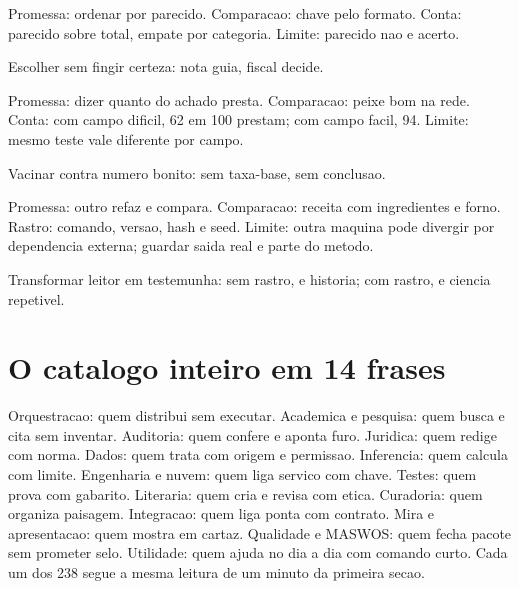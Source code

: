 
\begin{descricao}
Promessa: ordenar por parecido. Comparacao: chave pelo formato. Conta: parecido sobre total, empate por categoria. Limite: parecido nao e acerto.
\end{descricao}

\begin{funcao}
Escolher sem fingir certeza: nota guia, fiscal decide.
\end{funcao}


\begin{descricao}
Promessa: dizer quanto do achado presta. Comparacao: peixe bom na rede. Conta: com campo dificil, 62 em 100 prestam; com campo facil, 94. Limite: mesmo teste vale diferente por campo.
\end{descricao}

\begin{funcao}
Vacinar contra numero bonito: sem taxa-base, sem conclusao.
\end{funcao}


\begin{descricao}
Promessa: outro refaz e compara. Comparacao: receita com ingredientes e forno. Rastro: comando, versao, hash e seed. Limite: outra maquina pode divergir por dependencia externa; guardar saida real e parte do metodo.
\end{descricao}

\begin{funcao}
Transformar leitor em testemunha: sem rastro, e historia; com rastro, e ciencia repetivel.
\end{funcao}

\section{O catalogo inteiro em 14 frases}

\begin{descricao}
Orquestracao: quem distribui sem executar. Academica e pesquisa: quem busca e cita sem inventar. Auditoria: quem confere e aponta furo. Juridica: quem redige com norma. Dados: quem trata com origem e permissao. Inferencia: quem calcula com limite. Engenharia e nuvem: quem liga servico com chave. Testes: quem prova com gabarito. Literaria: quem cria e revisa com etica. Curadoria: quem organiza paisagem. Integracao: quem liga ponta com contrato. Mira e apresentacao: quem mostra em cartaz. Qualidade e MASWOS: quem fecha pacote sem prometer selo. Utilidade: quem ajuda no dia a dia com comando curto. Cada um dos 238 segue a mesma leitura de um minuto da primeira secao.
\end{descricao}

